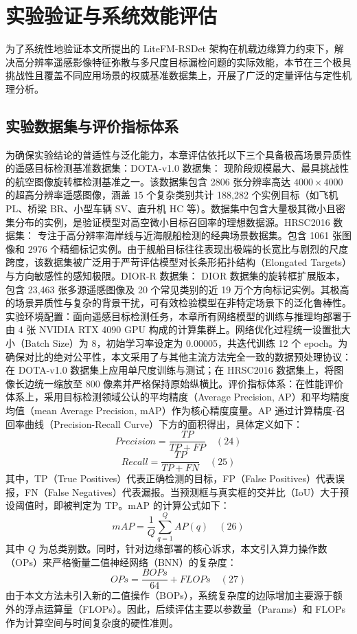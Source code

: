 \section{实验验证与系统效能评估}
为了系统性地验证本文所提出的 LiteFM-RSDet 架构在机载边缘算力约束下，解决高分辨率遥感影像特征弥散与多尺度目标漏检问题的实际效能，本节在三个极具挑战性且覆盖不同应用场景的权威基准数据集上，开展了广泛的定量评估与定性机理分析。

\subsection{实验数据集与评价指标体系}
为确保实验结论的普适性与泛化能力，本章评估依托以下三个具备极高场景异质性的遥感目标检测基准数据集：DOTA-v1.0 数据集： 现阶段规模最大、最具挑战性的航空图像旋转框检测基准之一。该数据集包含 2806 张分辨率高达 $4000 \times 4000$ 的超高分辨率遥感图像，涵盖 15 个复杂类别共计 188,282 个实例目标（如飞机 PL、桥梁 BR、小型车辆 SV、直升机 HC 等）。数据集中包含大量极其微小且密集分布的实例，是验证模型对高空微小目标召回率的理想数据源。HRSC2016 数据集： 专注于高分辨率海岸线与近海舰船检测的经典场景数据集。包含 1061 张图像和 2976 个精细标记实例。由于舰船目标往往表现出极端的长宽比与剧烈的尺度跨度，该数据集被广泛用于严苛评估模型对长条形拓扑结构（Elongated Targets）与方向敏感性的感知极限。DIOR-R 数据集： DIOR 数据集的旋转框扩展版本，包含 23,463 张多源遥感图像及 20 个常见类别的近 19 万个方向标记实例。其极高的场景异质性与复杂的背景干扰，可有效检验模型在非特定场景下的泛化鲁棒性。实验环境配置：面向遥感目标检测任务，本章所有网络模型的训练与推理均部署于由 4 张 NVIDIA RTX 4090 GPU 构成的计算集群上。网络优化过程统一设置批大小（Batch Size）为 8，初始学习率设定为 0.00005，共迭代训练 12 个 epoch。为确保对比的绝对公平性，本文采用了与其他主流方法完全一致的数据预处理协议：在 DOTA-v1.0 数据集上应用单尺度训练与测试；在 HRSC2016 数据集上，将图像长边统一缩放至 800 像素并严格保持原始纵横比。评价指标体系：在性能评价体系上，采用目标检测领域公认的平均精度（Average Precision, AP）和平均精度均值（mean Average Precision, mAP）作为核心精度度量。AP 通过计算精度-召回率曲线（Precision-Recall Curve）下方的面积得出，具体定义如下：$$Precision = \frac{TP}{TP + FP} \quad (24)$$$$Recall = \frac{TP}{TP + FN} \quad (25)$$其中，TP（True Positives）代表正确检测的目标，FP（False Positives）代表误报，FN（False Negatives）代表漏报。当预测框与真实框的交并比（IoU）大于预设阈值时，即被判定为 TP。mAP 的计算公式如下：$$mAP = \frac{1}{Q} \sum_{q=1}^{Q} AP(q) \quad (26)$$其中 $Q$ 为总类别数。同时，针对边缘部署的核心诉求，本文引入算力操作数（OPs）来严格衡量二值神经网络（BNN）的复杂度：$$OPs = \frac{BOPs}{64} + FLOPs \quad (27)$$由于本文方法未引入新的二值操作（BOPs），系统复杂度的边际增加主要源于额外的浮点运算量（FLOPs）。因此，后续评估主要以参数量（Params）和 FLOPs 作为计算空间与时间复杂度的硬性准则。

